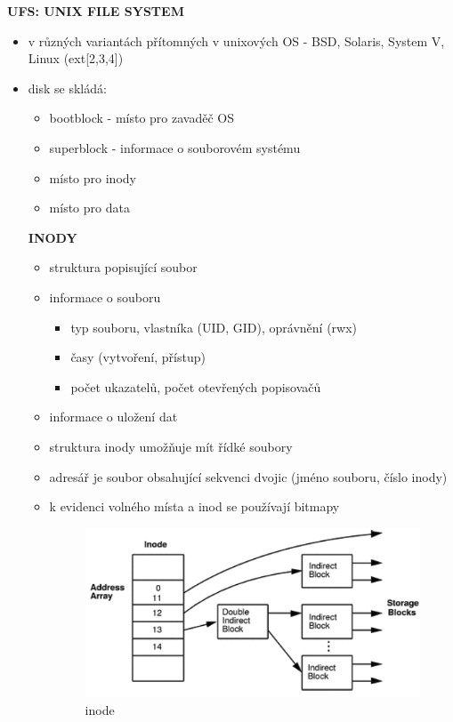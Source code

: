 \documentclass[10pt,a4paper]{article}
\begin{document}
\textbf{UFS: UNIX FILE SYSTEM}
\begin{itemize}
	\item v různých variantách přítomných v unixových OS - BSD, Solaris, System V, Linux (ext[2,3,4])
	\item disk se skládá:
	\begin{itemize}
		\item bootblock - místo pro zavaděč OS
		\item superblock - informace o souborovém systému
		\item místo pro inody
		\item místo pro data
	\end{itemize}
	\textbf{INODY}
	\begin{itemize}
		\item struktura popisující soubor
		\item informace o souboru
		\begin{itemize}
			\item typ souboru, vlastníka (UID, GID), oprávnění (rwx)
			\item časy (vytvoření, přístup)
			\item počet ukazatelů, počet otevřených popisovačů
		\end{itemize}
		\item informace o uložení dat
		\item struktura inody umožňuje mít řídké soubory
		\item adresář je soubor obsahující sekvenci dvojic (jméno souboru, číslo inody)
		\item k evidenci volného místa a inod se používají bitmapy
		\begin{figure} [h]
			\includegraphics[scale=0.9]{img/inode.png}
			\caption{inode}	
		\end{figure}
	\end{itemize}
\end{itemize}
\end{document}

